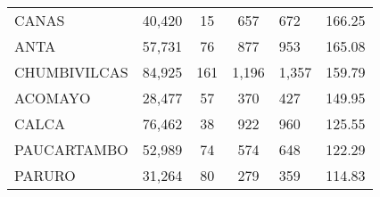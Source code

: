 \begin{tabular}{lrcclr}
	\cellcolor[HTML]{FFFF99}CANAS                                  & 40,420                                                         & 15                                                         & 657                  & 672                                                                 & 166.25                                                                       \\
	\cellcolor[HTML]{FFFF99}ANTA                                   & 57,731                                                         & 76                                                         & 877                  & 953                                                                 & 165.08                                                                       \\
	\cellcolor[HTML]{C6E0B4}CHUMBIVILCAS                           & 84,925                                                         & 161                                                        & 1,196                & 1,357                                                               & 159.79                                                                       \\
	\cellcolor[HTML]{C6E0B4}ACOMAYO                                & 28,477                                                         & 57                                                         & 370                  & 427                                                                 & 149.95                                                                       \\
	\cellcolor[HTML]{C6E0B4}CALCA                                  & 76,462                                                         & 38                                                         & 922                  & 960                                                                 & 125.55                                                                       \\
	\cellcolor[HTML]{C6E0B4}PAUCARTAMBO                            & 52,989                                                         & 74                                                         & 574                  & 648                                                                 & 122.29                                                                       \\
	\cellcolor[HTML]{C6E0B4}PARURO                                 & 31,264                                                         & 80                                                         & 279                  & 359                                                                 & 114.83                                                                       \\

\end{tabular}
